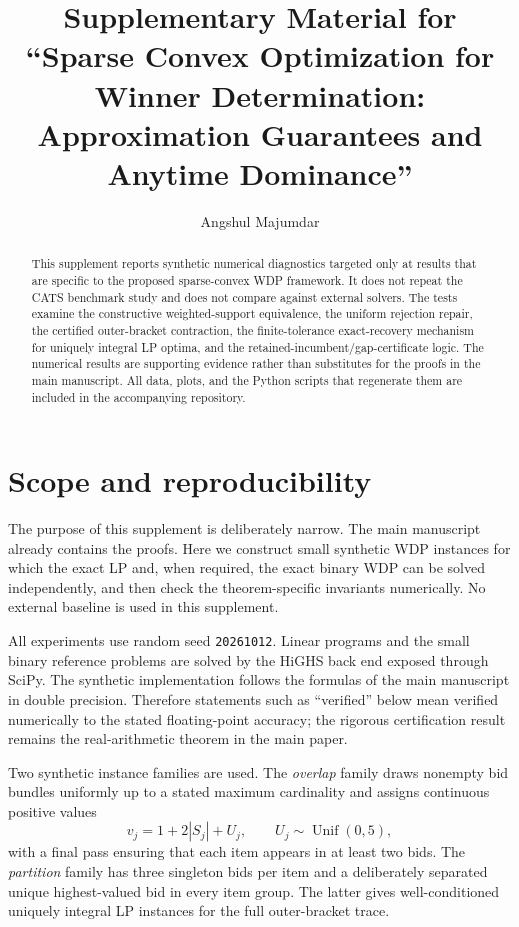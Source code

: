 \documentclass[preprint,12pt]{elsarticle}
\begin{document}
\begin{frontmatter}
\title{Supplementary Material for ``Sparse Convex Optimization for Winner Determination: Approximation Guarantees and Anytime Dominance''}
\author{Angshul Majumdar}
\address{Indraprastha Institute of Information Technology Delhi, New Delhi 110020, India}
\begin{abstract}
This supplement reports synthetic numerical diagnostics targeted only at results that are specific to the proposed sparse-convex WDP framework. It does not repeat the CATS benchmark study and does not compare against external solvers. The tests examine the constructive weighted-support equivalence, the uniform rejection repair, the certified outer-bracket contraction, the finite-tolerance exact-recovery mechanism for uniquely integral LP optima, and the retained-incumbent/gap-certificate logic. The numerical results are supporting evidence rather than substitutes for the proofs in the main manuscript. All data, plots, and the Python scripts that regenerate them are included in the accompanying repository.
\end{abstract}
\end{frontmatter}

\section{Scope and reproducibility}
The purpose of this supplement is deliberately narrow. The main manuscript already contains the proofs. Here we construct small synthetic WDP instances for which the exact LP and, when required, the exact binary WDP can be solved independently, and then check the theorem-specific invariants numerically. No external baseline is used in this supplement.

All experiments use random seed \texttt{20261012}. Linear programs and the small binary reference problems are solved by the HiGHS back end exposed through SciPy. The synthetic implementation follows the formulas of the main manuscript in double precision. Therefore statements such as ``verified'' below mean verified numerically to the stated floating-point accuracy; the rigorous certification result remains the real-arithmetic theorem in the main paper.

Two synthetic instance families are used. The \emph{overlap} family draws nonempty bid bundles uniformly up to a stated maximum cardinality and assigns continuous positive values
\[
  v_j=1+2|S_j|+U_j,\qquad U_j\sim\operatorname{Unif}(0,5),
\]
with a final pass ensuring that each item appears in at least two bids. The \emph{partition} family has three singleton bids per item and a deliberately separated unique highest-valued bid in every item group. The latter gives well-conditioned uniquely integral LP instances for the full outer-bracket trace.
\end{document}
